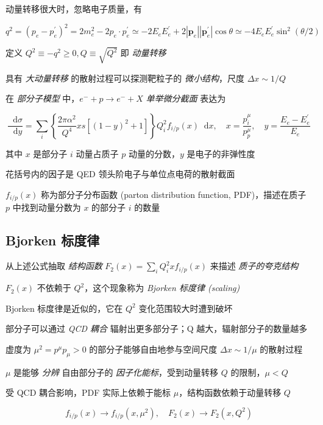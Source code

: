 \documentclass[oneside,a4paper,openany,11pt]{ctexbook}
\newcommand*{\dif}{\mathop{}\!\mathrm{d}} %
\begin{document}
动量转移很大时，忽略电子质量，有

\begin{equation}
    q^2 = (p_e - p_e^\prime)^2 = 2 m_e^2 - 2 p_e \cdot p_e^\prime \simeq -2 E_e E_e^\prime + 2 |\mathbf{p}_e| |\mathbf{p}_e^\prime| \cos\theta \simeq -4 E_e E_e^\prime \sin^2 (\theta/2)
\end{equation}

定义 $Q^2 \equiv -q^2 \ge 0, Q \equiv \sqrt{Q^2}$ 即 \emph{动量转移}

具有 \emph{大动量转移} 的散射过程可以探测靶粒子的 \emph{微小结构}，尺度 $\Delta x \sim 1/Q$

在 \emph{部分子模型} 中，$e^- + p \to e^- + X$ \emph{单举微分截面} 表达为

\begin{equation}
    \frac{\dif\sigma}{\dif y} = \sum_i \left\{\frac{2\pi\alpha^2}{Q^4} x s \left[(1-y)^2+1\right]\right\} Q_i^2 f_{i/p}(x) \dif x, \quad x = \frac{p_i^\mu}{p_p^\mu}, \quad y = \frac{E_e-E_e^\prime}{E_e}
\end{equation}

其中 $x$ 是部分子 $i$ 动量占质子 $p$ 动量的分数，$y$ 是电子的非弹性度

花括号内的因子是 QED 领头阶电子与单位点电荷的散射截面

$f_{i/p}(x)$ 称为部分子分布函数 (parton distribution function, PDF)，描述在质子 $p$ 中找到动量分数为 $x$ 的部分子 $i$ 的数量

\subsection{Bjorken 标度律}

从上述公式抽取 \emph{结构函数} $F_2(x)=\sum_i Q^2_i x f_{i/p}(x)$ 来描述 \emph{质子的夸克结构}

$F_2(x)$ 不依赖于 $Q^2$，这个现象称为 \emph{Bjorken 标度律 (scaling)}

Bjorken 标度律是近似的，它在 $Q^2$ 变化范围较大时遭到破坏

部分子可以通过 \emph{QCD 耦合} 辐射出更多部分子；Q 越大，辐射部分子的数量越多

虚度为 $\mu^2=p^\mu p_\mu > 0$ 的部分子能够自由地参与空间尺度 $\Delta x \sim 1/\mu$ 的散射过程

$\mu$ 是能够 \emph{分辨} 自由部分子的 \emph{因子化能标}，受到动量转移 $Q$ 的限制，$\mu < Q$

受 QCD 耦合影响，PDF 实际上依赖于能标 $\mu$，结构函数依赖于动量转移 $Q$

\begin{equation}
    f_{i/p}(x) \to f_{i/p}(x, \mu^2), \quad F_2(x) \to F_2(x, Q^2)
\end{equation}
\end{document}
